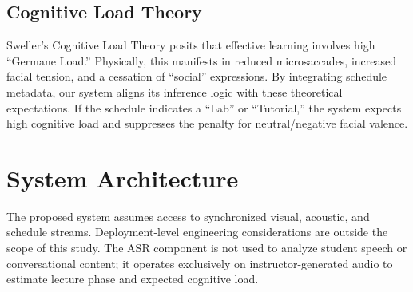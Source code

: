 \documentclass[conference]{IEEEtran}
\begin{document}
\subsection{Cognitive Load Theory}
Sweller's Cognitive Load Theory posits that effective learning involves high ``Germane Load.'' Physically, this manifests in reduced microsaccades, increased facial tension, and a cessation of ``social'' expressions. By integrating schedule metadata, our system aligns its inference logic with these theoretical expectations. If the schedule indicates a ``Lab'' or ``Tutorial,'' the system expects high cognitive load and suppresses the penalty for neutral/negative facial valence.

\section{System Architecture}

The proposed system assumes access to synchronized visual, acoustic, and schedule streams. Deployment-level engineering considerations are outside the scope of this study. The ASR component is not used to analyze student speech or conversational content; it operates exclusively on instructor-generated audio to estimate lecture phase and expected cognitive load.
\end{document}
